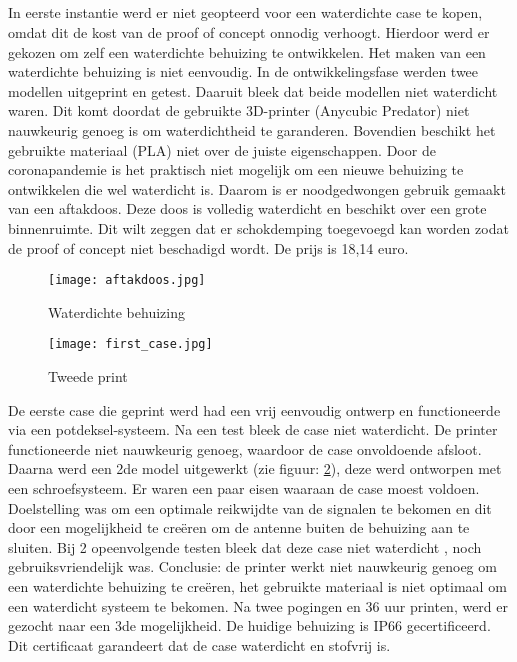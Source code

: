 \subsection{}
In eerste instantie werd er niet geopteerd voor een waterdichte case te kopen, omdat dit de kost van de proof of concept onnodig verhoogt. Hierdoor werd er gekozen om zelf een waterdichte behuizing te ontwikkelen.
\newline 
Het maken van een waterdichte behuizing is niet eenvoudig. In de ontwikkelingsfase werden twee modellen uitgeprint en getest. Daaruit bleek dat beide modellen niet waterdicht waren. Dit komt doordat de gebruikte 3D-printer (Anycubic Predator) niet nauwkeurig genoeg is om waterdichtheid te garanderen. Bovendien beschikt het gebruikte materiaal (PLA) niet over de juiste eigenschappen. Door de coronapandemie is het praktisch niet mogelijk om een nieuwe behuizing te ontwikkelen die wel waterdicht is. Daarom is er noodgedwongen gebruik gemaakt van een aftakdoos. Deze doos is volledig waterdicht en beschikt over een grote binnenruimte. Dit wilt zeggen dat er schokdemping toegevoegd kan worden zodat de proof of concept niet beschadigd wordt. De prijs is 18,14 euro.
\begin{figure}
	\texttt{[image: aftakdoos.jpg]}
	\caption{Waterdichte behuizing}
	\label{fig:case}
\end{figure}
\begin{figure}
	\texttt{[image: first\_case.jpg]}
	\caption{Tweede print}
	\label{fig:first_case}
\end{figure}
\newline
De eerste case die geprint werd had een vrij eenvoudig ontwerp en functioneerde via een potdeksel-systeem. Na een test bleek de case niet waterdicht. De printer functioneerde niet nauwkeurig genoeg, waardoor de case onvoldoende afsloot. 
Daarna werd een 2de model uitgewerkt (zie figuur: \ref{fig:first_case}), deze werd ontworpen met een schroefsysteem. 
Er waren een paar eisen waaraan de case moest voldoen. Doelstelling was om een optimale reikwijdte van de signalen te bekomen en dit door een mogelijkheid te creëren om de antenne buiten de behuizing aan te sluiten. 
Bij 2 opeenvolgende testen bleek dat deze case niet waterdicht , noch gebruiksvriendelijk was. Conclusie: de printer werkt niet nauwkeurig genoeg om een waterdichte behuizing te creëren, het gebruikte materiaal is niet optimaal om een waterdicht systeem te bekomen.  Na twee pogingen en 36 uur printen, werd er gezocht naar een 3de mogelijkheid. De huidige behuizing is IP66 gecertificeerd. Dit certificaat garandeert dat de case waterdicht en stofvrij is.

